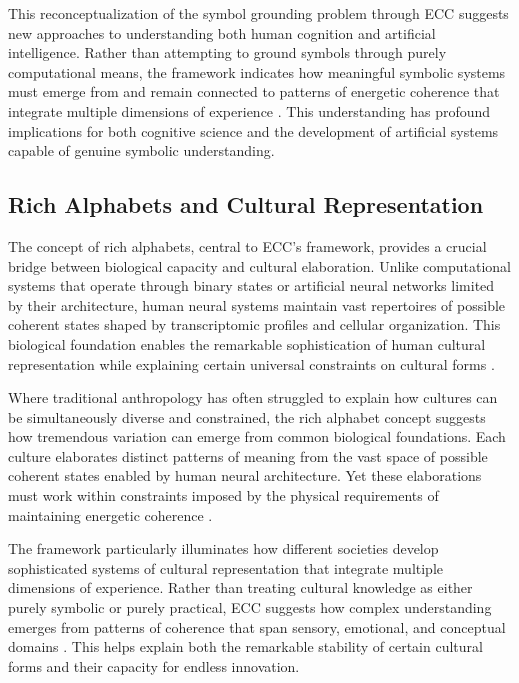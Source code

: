 \begin{refsection}
This reconceptualization of the symbol grounding problem through ECC suggests new approaches to understanding both human cognition and artificial intelligence. Rather than attempting to ground symbols through purely computational means, the framework indicates how meaningful symbolic systems must emerge from and remain connected to patterns of energetic coherence that integrate multiple dimensions of experience \cite{harnad1990symbol}. This understanding has profound implications for both cognitive science and the development of artificial systems capable of genuine symbolic understanding.

\subsection{Rich Alphabets and Cultural Representation}

The concept of rich alphabets, central to ECC's framework, provides a crucial bridge between biological capacity and cultural elaboration. Unlike computational systems that operate through binary states or artificial neural networks limited by their architecture, human neural systems maintain vast repertoires of possible coherent states shaped by transcriptomic profiles and cellular organization. This biological foundation enables the remarkable sophistication of human cultural representation while explaining certain universal constraints on cultural forms \cite{shore1996culture}.

Where traditional anthropology has often struggled to explain how cultures can be simultaneously diverse and constrained, the rich alphabet concept suggests how tremendous variation can emerge from common biological foundations. Each culture elaborates distinct patterns of meaning from the vast space of possible coherent states enabled by human neural architecture. Yet these elaborations must work within constraints imposed by the physical requirements of maintaining energetic coherence \cite{wagner1981invention}.

The framework particularly illuminates how different societies develop sophisticated systems of cultural representation that integrate multiple dimensions of experience. Rather than treating cultural knowledge as either purely symbolic or purely practical, ECC suggests how complex understanding emerges from patterns of coherence that span sensory, emotional, and conceptual domains \cite{geertz1973interpretation}. This helps explain both the remarkable stability of certain cultural forms and their capacity for endless innovation.


\end{refsection}
